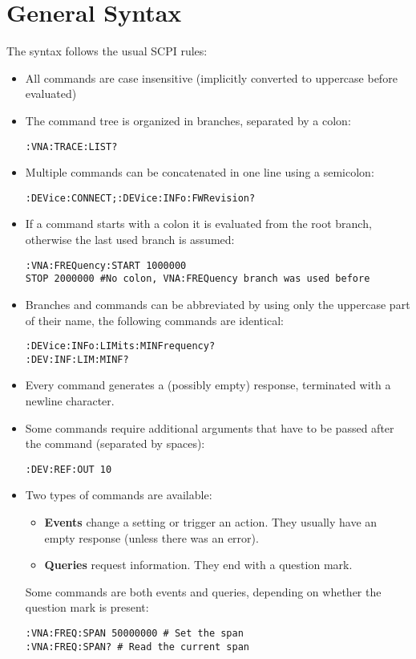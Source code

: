 \documentclass[a4paper,11pt]{article}
\begin{document}
\section{General Syntax}
The syntax follows the usual SCPI rules:
\begin{itemize}
\item All commands are case insensitive (implicitly converted to uppercase before evaluated)
\item The command tree is organized in branches, separated by a colon:
\begin{lstlisting}
:VNA:TRACE:LIST?
\end{lstlisting}
\item Multiple commands can be concatenated in one line using a semicolon:
\begin{lstlisting}
:DEVice:CONNECT;:DEVice:INFo:FWRevision?
\end{lstlisting}
\item If a command starts with a colon it is evaluated from the root branch, otherwise the last used branch is assumed:
\begin{lstlisting}
:VNA:FREQuency:START 1000000
STOP 2000000 #No colon, VNA:FREQuency branch was used before
\end{lstlisting}
\item Branches and commands can be abbreviated by using only the uppercase part of their name, the following commands are identical:
\begin{lstlisting}
:DEVice:INFo:LIMits:MINFrequency?
:DEV:INF:LIM:MINF?
\end{lstlisting}
\item Every command generates a (possibly empty) response, terminated with a newline character.
\item Some commands require additional arguments that have to be passed after the command (separated by spaces):
\begin{lstlisting}
:DEV:REF:OUT 10
\end{lstlisting}
\item Two types of commands are available:
\begin{itemize}
\item \textbf{Events} change a setting or trigger an action. They usually have an empty response (unless there was an error).
\item \textbf{Queries} request information. They end with a question mark.
\end{itemize}
Some commands are both events and queries, depending on whether the question mark is present:
\begin{lstlisting}
:VNA:FREQ:SPAN 50000000 # Set the span
:VNA:FREQ:SPAN? # Read the current span
\end{lstlisting}
\end{itemize}
\end{document}
